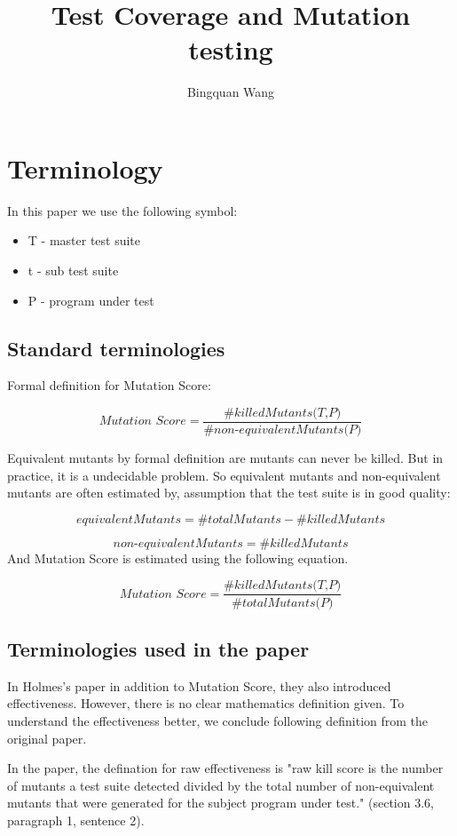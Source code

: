 \documentclass[a4paper]{article}
\title{Test Coverage and Mutation testing}
\author{
Bingquan Wang      
}
\date{}
\begin{document}
       
\maketitle


\section{Terminology}
\label{sec:intro}
In this paper we use the following symbol:
\begin{itemize}
	\item T - master test suite
	\item t - sub test suite
	\item P - program under test
\end{itemize}
\subsection{Standard terminologies}
Formal definition for Mutation Score:

\[\textit{Mutation Score} = \frac{\#\textit{killedMutants(T,P)}}{\#\textit{non-equivalentMutants(P)}}\]

Equivalent mutants by formal definition are mutants can never be killed. But in practice, it is a undecidable problem. So equivalent mutants and non-equivalent mutants are often estimated by,  assumption that the test suite is in good quality:

\[\textit{equivalentMutants} = \#\textit{totalMutants} - \#\textit{killedMutants}\]

\[\textit{non-equivalentMutants} = \#\textit{killedMutants}\]
And Mutation Score is estimated using the following equation.

\[\textit{Mutation Score} = \frac{\#\textit{killedMutants(T,P)}}{\#\textit{totalMutants(P)}}\]

\subsection{Terminologies used in the paper}
In Holmes's paper in addition to Mutation Score, they also introduced effectiveness. However, there is no clear mathematics definition given. To understand the effectiveness better, we conclude following definition from the original paper.

In the paper, the defination for raw effectiveness is "raw kill score is the number of mutants a test suite detected divided by the total number of non-equivalent mutants that were generated for the subject program under test." (section 3.6, paragraph 1, sentence 2).
\end{document}

